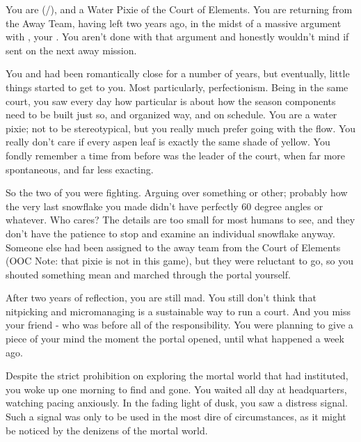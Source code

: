 \documentclass[char]{PP}
\begin{document}
\name{\cELove{}}

You are \cELove{} (\cELove{\They}/\cELove{\Them}), and a Water Pixie of the Court of Elements. You are returning from the Away Team, having left two years ago, in the midst of a massive argument with \cEHead{}, your \cEHead{\partner}. You aren’t done with that argument and honestly wouldn’t mind if \cEHead{} sent \cEHead{\themself} on the next away mission.

You and \cEHead{} had been romantically close for a number of years, but eventually, little things started to get to you. Most particularly, \cEHead{\their} perfectionism. Being in the same court, you saw every day how particular \cEHead{} is about how the season components need to be built just so, and organized \cEHead{\their} way, and on \cEHead{\their} schedule. You are a water pixie; not to be stereotypical, but you really much prefer going with the flow. You really don’t care if every aspen leaf is exactly the same shade of yellow. You fondly remember a time from before \cEHead{} was the leader of the court, when \cEHead{\they} \cEHead{\were} far more spontaneous, and far less exacting.

So the two of you were fighting. Arguing over something or other; probably how the very last snowflake you made didn’t have perfectly 60 degree angles or whatever. Who cares? The details are too small for most humans to see, and they don’t have the patience to stop and examine an individual snowflake anyway. Someone else had been assigned to the away team from the Court of Elements (OOC Note: that pixie is not in this game), but they were reluctant to go, so you shouted something mean and marched through the portal yourself.

After two years of reflection, you are still mad. You still don’t think that nitpicking and micromanaging is a sustainable way to run a court. And you miss your friend - who \cEHead{} was before all of the responsibility. You were planning to give \cEHead{} a piece of your mind the moment the portal opened, until what happened a week ago.

Despite the strict prohibition on exploring the mortal world that \cSPM{} had instituted, you woke up one morning to find \cFLost{} and \cMChange{} gone. You waited all day at headquarters, watching \cSPM{} pacing anxiously. In the fading light of dusk, you saw a distress signal. Such a signal was only to be used in the most dire of circumstances, as it might be noticed by the denizens of the mortal world. 
\end{document}
